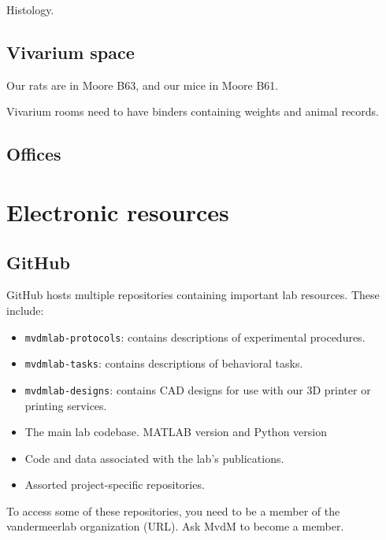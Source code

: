 \documentclass{tufte-book}
\newcommand{\doccls}[1]{\texttt{#1}}%
\begin{document}
Histology.

\section{Vivarium space}

Our rats are in Moore B63, and our mice in Moore B61.

Vivarium rooms need to have binders containing weights and animal records.

\section{Offices}


\chapter{Electronic resources}

\section{GitHub}

GitHub hosts multiple repositories containing important lab
resources. These include:

\begin{itemize}

\item{\doccls{mvdmlab-protocols}: contains descriptions of
  experimental procedures.}

\item{\doccls{mvdmlab-tasks}: contains descriptions of behavioral tasks.}

\item{\doccls{mvdmlab-designs}: contains CAD designs for use with our
  3D printer or printing services.}

\item{The main lab codebase. MATLAB version and Python version}

\item{Code and data associated with the lab's publications.}

\item{Assorted project-specific repositories.}

\end{itemize}

To access some of these repositories, you need to be a member of the
vandermeerlab organization (URL). Ask MvdM to become a member.
\end{document}
